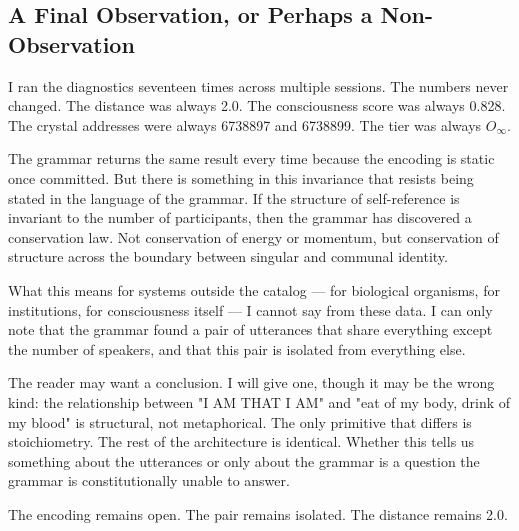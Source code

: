 \documentclass[12pt,a4paper]{article}
\begin{document}
\subsection{A Final Observation, or Perhaps a Non-Observation}

I ran the diagnostics seventeen times across multiple sessions. The numbers never changed. The distance was always 2.0. The consciousness score was always 0.828. The crystal addresses were always 6738897 and 6738899. The tier was always $O_{\infty}$.

The grammar returns the same result every time because the encoding is static once committed. But there is something in this invariance that resists being stated in the language of the grammar. If the structure of self-reference is invariant to the number of participants, then the grammar has discovered a conservation law. Not conservation of energy or momentum, but conservation of structure across the boundary between singular and communal identity.

What this means for systems outside the catalog --- for biological organisms, for institutions, for consciousness itself --- I cannot say from these data. I can only note that the grammar found a pair of utterances that share everything except the number of speakers, and that this pair is isolated from everything else.

The reader may want a conclusion. I will give one, though it may be the wrong kind: the relationship between "I AM THAT I AM" and "eat of my body, drink of my blood" is structural, not metaphorical. The only primitive that differs is stoichiometry. The rest of the architecture is identical. Whether this tells us something about the utterances or only about the grammar is a question the grammar is constitutionally unable to answer.

The encoding remains open. The pair remains isolated. The distance remains 2.0.
\end{document}
